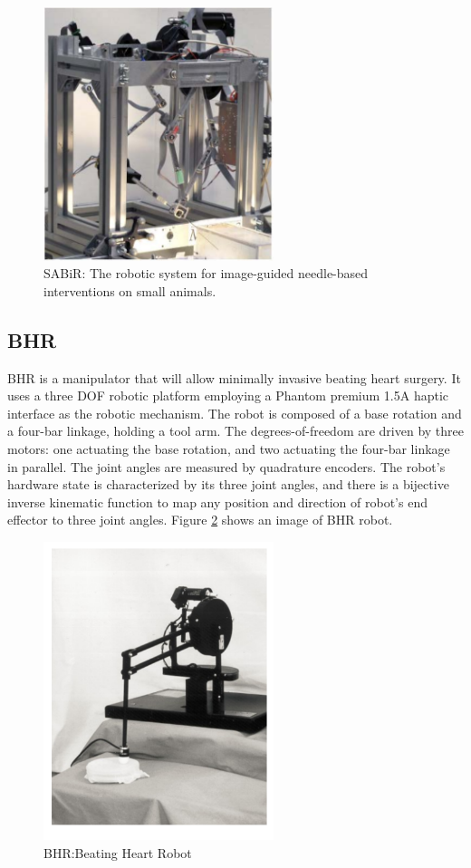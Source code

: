 \begin{figure}[!thpb]
\centering
\includegraphics[width=0.6\textwidth]{chapter5_SABiR.pdf}
\caption{SABiR: The robotic system for image-guided needle-based interventions on small animals.}
\label{sabir}
\end{figure}

\subsection{BHR}
BHR is a manipulator that will allow minimally invasive beating heart surgery\cite{bebek2008robotic}. It uses a three DOF robotic platform employing a Phantom premium 1.5A haptic interface \cite{cavusoglu2001kinematics} as the robotic mechanism. The robot is composed of a base rotation and a four-bar linkage, holding a tool arm. The degrees-of-freedom are driven by three motors: one actuating the base rotation, and two actuating the four-bar linkage in parallel. The joint angles are measured by quadrature encoders. The robot’s hardware state is characterized by its three joint angles, and there is a bijective inverse kinematic function to map any position and direction of robot’s end effector to three joint angles. Figure \ref{bhr} shows an image of BHR robot.

\begin{figure}[!thpb]
\centering
\includegraphics[width=0.6\textwidth]{chapter5_BHR.pdf}
\caption{BHR:Beating Heart Robot}
\label{bhr}
\end{figure}

